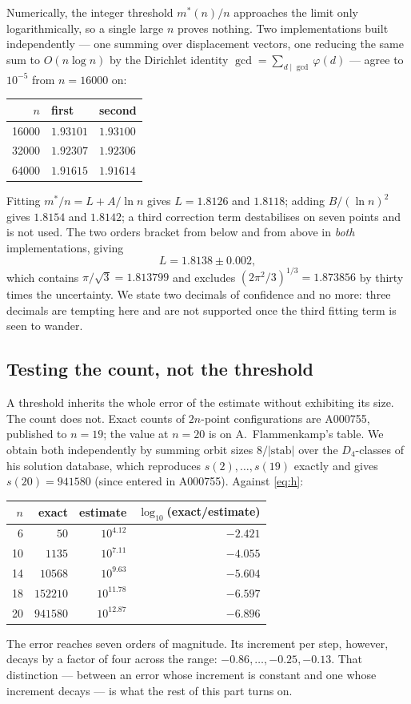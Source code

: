 \documentclass[11pt,a4paper]{article}
\begin{document}
Numerically, the integer threshold $m^*(n)/n$ approaches the limit only logarithmically, so a
single large $n$ proves nothing.  Two implementations built independently --- one summing over
displacement vectors, one reducing the same sum to $O(n\log n)$ by the Dirichlet identity
$\gcd=\sum_{d\mid\gcd}\varphi(d)$ --- agree to $10^{-5}$ from $n=16000$ on:
\begin{center}
\begin{tabular}{rll}
\toprule
$n$ & first & second\\
\midrule
16000 & $1.93101$ & $1.93100$\\
32000 & $1.92307$ & $1.92306$\\
64000 & $1.91615$ & $1.91614$\\
\bottomrule
\end{tabular}
\end{center}
Fitting $m^*/n=L+A/\ln n$ gives $L=1.8126$ and $1.8118$; adding $B/(\ln n)^2$ gives $1.8154$ and
$1.8142$; a third correction term destabilises on seven points and is not used.  The two orders
bracket from below and from above in \emph{both} implementations, giving
\[L=1.8138\pm0.002,\]
which contains $\pi/\sqrt3=1.813799$ and excludes $(2\pi^2/3)^{1/3}=1.873856$ by thirty times the
uncertainty.  We state two decimals of confidence and no more: three decimals are tempting here and
are not supported once the third fitting term is seen to wander.

\subsection{Testing the count, not the threshold}\label{s:count}
A threshold inherits the whole error of the estimate without exhibiting its size.  The count does
not.  Exact counts of $2n$-point configurations are A000755, published to $n=19$; the value at
$n=20$ is on A.~Flammenkamp's table.  We obtain both independently by summing orbit sizes
$8/|\mathrm{stab}|$ over the $D_4$-classes of his solution database, which reproduces
$s(2),\dots,s(19)$ exactly and gives $s(20)=941580$ (since entered in A000755).  Against \eqref{eq:h}:
\begin{center}
\begin{tabular}{rrrr}
\toprule
$n$ & exact & estimate & $\log_{10}$(exact/estimate) \\
\midrule
 6 & $50$      & $10^{4.12}$  & $-2.421$\\
10 & $1135$    & $10^{7.11}$  & $-4.055$\\
14 & $10568$   & $10^{9.63}$  & $-5.604$\\
18 & $152210$  & $10^{11.78}$ & $-6.597$\\
20 & $941580$  & $10^{12.87}$ & $-6.896$\\
\bottomrule
\end{tabular}
\end{center}
The error reaches seven orders of magnitude.  Its increment per step, however, decays by a factor
of four across the range: $-0.86,\dots,-0.25,-0.13$.  That distinction --- between an error whose
increment is constant and one whose increment decays --- is what the rest of this part turns on.
\end{document}
